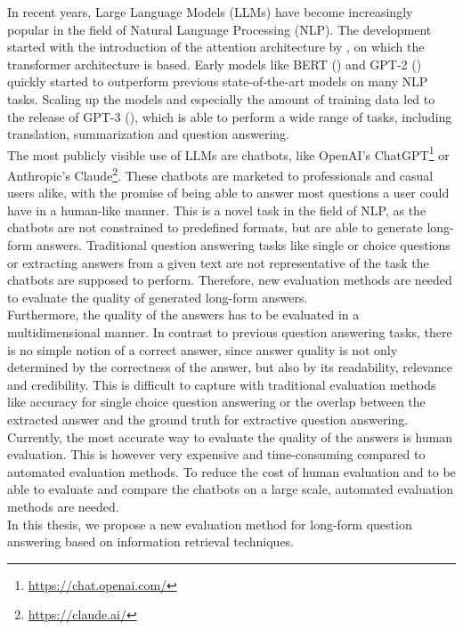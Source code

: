 In recent years, Large Language Models (LLMs) have become increasingly popular in the field of Natural Language Processing (NLP).
The development started with the introduction of the attention architecture by \cite{vaswani:2017:Attention}, on which the transformer architecture is based.
Early models like BERT (\cite{devlin:2018:BERT}) and GPT-2 (\cite{radford:2018:Improving}) quickly started to outperform previous state-of-the-art models on many NLP tasks.
Scaling up the models and especially the amount of training data led to the release of GPT-3 (\cite{brown:2020:Language}), which is able to perform a wide range of tasks, including translation, summarization and question answering.
\\
The most publicly visible use of LLMs are chatbots, like OpenAI's ChatGPT\footnote{\url{https://chat.openai.com/}} or Anthropic's Claude\footnote{\url{https://claude.ai/}}.
These chatbots are marketed to professionals and casual users alike, with the promise of being able to answer most questions a user could have in a human-like manner.
This is a novel task in the field of NLP, as the chatbots are not constrained to predefined formats, but are able to generate long-form answers.
Traditional question answering tasks like single or choice questions or extracting answers from a given text are not representative of the task the chatbots are supposed to perform.
Therefore, new evaluation methods are needed to evaluate the quality of generated long-form answers.
\\
Furthermore, the quality of the answers has to be evaluated in a multidimensional manner.
In contrast to previous question answering tasks, there is no simple notion of a correct answer, since answer quality is not only determined by the correctness of the answer, but also by its readability, relevance and credibility.
This is difficult to capture with traditional evaluation methods like accuracy for single choice question answering or the overlap between the extracted answer and the ground truth for extractive question answering.
\\
Currently, the most accurate way to evaluate the quality of the answers is human evaluation.
This is however very expensive and time-consuming compared to automated evaluation methods.
To reduce the cost of human evaluation and to be able to evaluate and compare the chatbots on a large scale, automated evaluation methods are needed.
\\
In this thesis, we propose a new evaluation method for long-form question answering based on information retrieval techniques.
